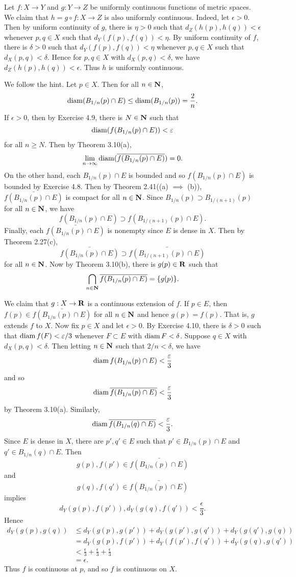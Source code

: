\begin{ex}
Let $f: X \to Y$ and $g: Y \to Z$ be uniformly continuous functions of metric spaces. We claim that $h = g\circ f: X \to Z$ is also uniformly continuous. Indeed, let $\epsilon > 0$. Then by uniform continuity of $g$, there is $\eta > 0$ such that $d_Z(h(p), h(q)) < \epsilon$ whenever $p, q \in X$ such that $d_Y(f(p), f(q)) < \eta$. By uniform continuity of $f$, there is $\delta > 0$ such that $d_Y(f(p), f(q)) < \eta$ whenever $p, q \in X$ such that $d_X(p, q) < \delta$. Hence for $p, q \in X$ with $d_X(p, q) < \delta$, we have $d_Z(h(p), h(q)) < \epsilon$. Thus $h$ is uniformly continuous.
\end{ex}

\begin{ex}
We follow the hint. Let $p \in X$. Then for all $n \in \mathbf{N}$, \[\operatorname{diam}(B_{1/n}(p)\cap E) \leq \operatorname{diam}(B_{1/n}(p)) = \frac{2}{n}.\] If $\epsilon > 0$, then by Exercise 4.9, there is $N \in \mathbf{N}$ such that \[\operatorname{diam}(f(B_{1/n}(p)\cap E)) < \varepsilon\] for all $n \geq N$. Then by Theorem 3.10(a), \[\lim_{n\to\infty}\operatorname{diam}(\overline{f(B_{1/n}(p)\cap E)}) = 0.\] On the other hand, each $B_{1/n}(p)\cap E$ is bounded and so $f(B_{1/n}(p)\cap E)$ is bounded by Exercise 4.8. Then by Theorem 2.41((a) $\implies$ (b)), $\bar{f(B_{1/n}(p)\cap E)}$ is compact for all $n \in \mathbf{N}$. Since $B_{1/n}(p) \supset B_{1/(n+1)}(p)$ for all $n \in \mathbf{N}$, we have \[f(B_{1/n}(p)\cap E) \supset f(B_{1/(n+1)}(p)\cap E).\] Finally, each $\bar{f(B_{1/n}(p)\cap E)}$ is nonempty since $E$ is dense in $X$. Then by Theorem 2.27(c), \[\bar{f(B_{1/n}(p)\cap E)} \supset \bar{f(B_{1/(n+1)}(p)\cap E)}\] for all $n \in \mathbf{N}$. Now by Theorem 3.10(b), there is $g(p) \in \mathbf{R}$ such that \[\bigcap_{n \in \mathbf{N}}\overline{f(B_{1/n}(p)\cap E)} = \{g(p)\}.\]

We claim that $g: X \to \mathbf{R}$ is a continuous extension of $f$. If $p \in E$, then $f(p) \in \bar{f(B_{1/n}(p)\cap E)}$ for all $n \in \mathbf{N}$ and hence $g(p) = f(p)$. That is, $g$ extends $f$ to $X$. Now fix $p \in X$ and let $\epsilon > 0$. By Exercise 4.10, there is $\delta > 0$ such that $\operatorname{diam} f(F) < \varepsilon/3$ whenever $F \subset E$ with $\operatorname{diam} F < \delta$. Suppose $q \in X$ with $d_X(p, q) < \delta$. Then letting $n \in \mathbf{N}$ such that $2/n < \delta$, we have \[\operatorname{diam} f(B_{1/n}(p)\cap E) < \frac{\varepsilon}{3}\] and so \[\operatorname{diam}\overline{f(B_{1/n}(p)\cap E)} < \frac{\varepsilon}{3}\] by Theorem 3.10(a). Similarly, \[\operatorname{diam}\overline{f(B_{1/n}(q)\cap E)} < \frac{\varepsilon}{3}.\]Since $E$ is dense in $X$, there are $p', q' \in E$ such that $p' \in B_{1/n}(p)\cap E$ and $q' \in B_{1/n}(q)\cap E$. Then \[g(p), f(p') \in \bar{f(B_{1/n}(p)\cap E)}\] and \[g(q), f(q') \in \bar{f(B_{1/n}(p)\cap E)}\] implies \[d_Y(g(p), f(p')), d_Y(g(q), f(q')) < \frac{\epsilon}{3}.\] Hence
\begin{align*}
d_Y(g(p), g(q)) & \leq d_Y(g(p), g(p')) + d_Y(g(p'), g(q')) + d_Y(g(q'), g(q))\\
& = d_Y(g(p), f(p')) + d_Y(f(p'), f(q')) + d_Y(g(q), g(q'))\\
& < \frac{\epsilon}{3} + \frac{\epsilon}{3} + \frac{\epsilon}{3}\\
& = \epsilon.
\end{align*}
Thus $f$ is continuous at $p$, and so $f$ is continuous on $X$.


\end{ex}
